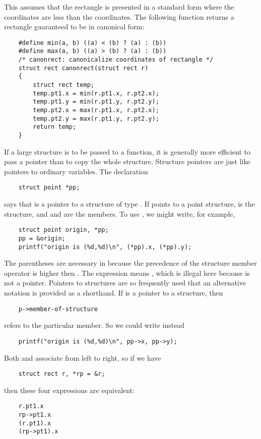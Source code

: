 This assumes that the rectangle is presented in a standard form where the  coordinates are less than the  coordinates.
The following function returns a rectangle guaranteed to be in canonical form:
\begin{lstlisting}
	#define min(a, b) ((a) < (b) ? (a) : (b))
	#define max(a, b) ((a) > (b) ? (a) : (b))
	/* canonrect: canonicalize coordinates of rectangle */
	struct rect canonrect(struct rect r)
	{
		struct rect temp;
		temp.pt1.x = min(r.pt1.x, r.pt2.x);
		temp.pt1.y = min(r.pt1.y, r.pt2.y);
		temp.pt2.x = max(r.pt1.x, r.pt2.x);
		temp.pt2.y = max(r.pt1.y, r.pt2.y);
		return temp;
	}
\end{lstlisting}
If a large structure is to be passed to a function, it is generally more efficient to pass a pointer than to copy the whole structure.
Structure pointers are just like pointers to ordinary variables.
The declaration
\begin{lstlisting}
	struct point *pp;
\end{lstlisting}
says that  is a pointer to a structure of type .
If  points to a point structure,  is the structure, and  and  are the members.
To use , we might write, for example,
\begin{lstlisting}
	struct point origin, *pp;
	pp = &origin;
	printf("origin is (%d,%d)\n", (*pp).x, (*pp).y);
\end{lstlisting}
The parentheses are necessary in  because the precedence of the structure member operator  is higher then \code{*}.
The expression  means , which is illegal here because  is not a pointer.
Pointers to structures are so frequently used that an alternative notation is provided as a shorthand.
If  is a pointer to a structure, then
\begin{lstlisting}
	p->member-of-structure
\end{lstlisting}
refers to the particular member. So we could write instead
\begin{lstlisting}
	printf("origin is (%d,%d)\n", pp->x, pp->y);
\end{lstlisting}
Both  and \code{->} associate from left to right, so if we have
\begin{lstlisting}
	struct rect r, *rp = &r;
\end{lstlisting}
then these four expressions are equivalent:
\begin{lstlisting}
	r.pt1.x
	rp->pt1.x
	(r.pt1).x
	(rp->pt1).x
\end{lstlisting}
